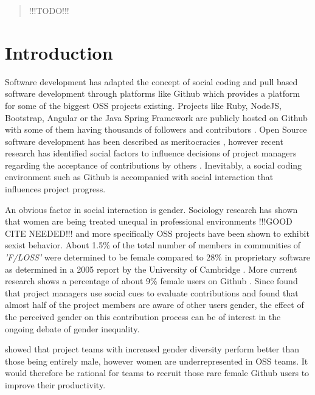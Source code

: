 \begin{abstract}%
!!!TODO!!! %
\end{abstract}


\section{Introduction}\label{Introduction}

Software development has adapted the concept of social coding and pull based software development through platforms like Github which provides a platform for some of the biggest \ac{OSS} projects existing. Projects like Ruby, NodeJS, Bootstrap, Angular or the Java Spring Framework are publicly hosted on Github with some of them having thousands of followers and contributors \cite{Gousi13}. Open Source software development has been described as meritocracies \cite{Scacchi:2007:FSS:1295014.1295019}, however recent research has identified social factors to influence decisions of project managers regarding the acceptance of contributions by others \cite{Tsay:2014:IST:2568225.2568315}. Inevitably, a social coding environment such as Github is accompanied with social interaction that influences project progress.

An obvious factor in social interaction is gender. Sociology research has shown that women are being treated unequal in professional environments !!!GOOD CITE NEEDED!!! %
and more specifically \ac{OSS} projects have been shown to exhibit sexist behavior. About 1.5\% of the total number of members in communities of \emph{'\ac{F/LOSS}'} were determined to be female compared to 28\% in proprietary software as determined in a 2005 report by the University of Cambridge \cite{flosspols-gender:2005}. More current research shows a percentage of about 9\% female users on Github \cite{Vasilescu:2015:GTD:2702123.2702549}. Since \citeauthor{Tsay:2014:IST:2568225.2568315} found that project managers use social cues to evaluate contributions and \citeauthor{Vasilescu:2015:GTD:2702123.2702549} found that almost half of the project members are aware of other users gender, the effect of the perceived gender on this contribution process can be of interest in the ongoing debate of gender inequality. 

\citeauthor{Vasilescu:2015:GTD:2702123.2702549} showed that project teams with increased gender diversity perform better than those being entirely male, however women are underrepresented in \ac{OSS} teams. It would therefore be rational for teams to recruit those rare female Github users to improve their productivity.

